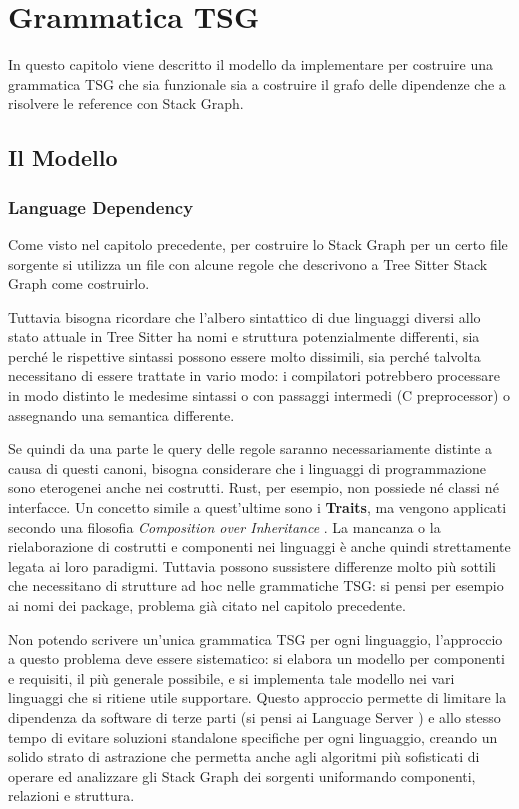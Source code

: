 \chapter{Grammatica TSG}

In questo capitolo viene descritto il modello da implementare per costruire una grammatica TSG che sia funzionale sia a costruire il grafo delle dipendenze che a risolvere le reference con Stack Graph.

\section{Il Modello}

\subsection{Language Dependency}

Come visto nel capitolo precedente, per costruire lo Stack Graph per un certo file sorgente si utilizza un file con alcune regole che descrivono a Tree Sitter Stack Graph come costruirlo.

\par
Tuttavia bisogna ricordare che l'albero sintattico di due linguaggi diversi allo stato attuale in Tree Sitter ha nomi e struttura potenzialmente differenti, sia perch\'e le rispettive sintassi possono essere molto dissimili, sia perch\'e talvolta necessitano di essere trattate in vario modo: i compilatori potrebbero processare in modo distinto le medesime sintassi o con passaggi intermedi (C preprocessor) o assegnando una semantica differente.

\par
Se quindi da una parte le query delle regole saranno necessariamente distinte a causa di questi canoni, bisogna considerare che i linguaggi di programmazione sono eterogenei anche nei costrutti.
Rust, per esempio, non possiede n\'e classi n\'e interfacce. Un concetto simile a quest'ultime sono i \textbf{Traits}, ma vengono applicati secondo una filosofia \emph{Composition over Inheritance} \cite{gamma1995design}.
La mancanza o la rielaborazione di costrutti e componenti nei linguaggi \`e anche quindi strettamente legata ai loro paradigmi. Tuttavia possono sussistere differenze molto pi\`u sottili che necessitano di strutture ad hoc nelle grammatiche TSG: si pensi per esempio ai nomi dei package, problema gi\`a citato nel capitolo precedente.

\par
Non potendo scrivere un'unica grammatica TSG per ogni linguaggio, l'approccio a questo problema deve essere sistematico: si elabora un modello per componenti e requisiti, il pi\`u generale possibile, e si implementa tale modello nei vari linguaggi che si ritiene utile supportare.
Questo approccio permette di limitare la dipendenza da software di terze parti (si pensi ai Language Server \cite{LanguageServer}) e allo stesso tempo di evitare soluzioni standalone specifiche per ogni linguaggio, creando un solido strato di astrazione che permetta anche agli algoritmi pi\`u sofisticati di operare ed analizzare gli Stack Graph dei sorgenti uniformando componenti, relazioni e struttura.

